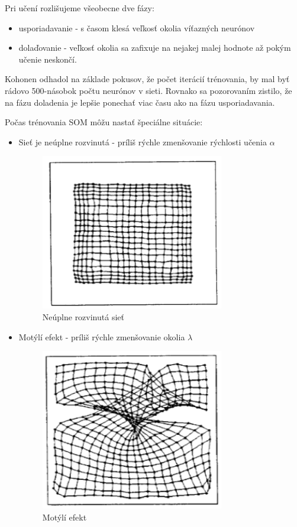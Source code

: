 Pri učení rozlišujeme všeobecne dve fázy:
\begin{itemize}
	\item usporiadavanie - s časom klesá veľkosť okolia víťazných neurónov 
	\item dolaďovanie - veľkosť okolia sa zafixuje na nejakej malej hodnote až pokým učenie neskončí.
\end{itemize}

Kohonen odhadol na základe pokusov, že počet iterácií trénovania, by mal byť rádovo 500-násobok počtu neurónov v sieti.
Rovnako sa pozorovaním zistilo, že na fázu doladenia je lepšie ponechať viac času ako na fázu usporiadavania.

Počas trénovania SOM môžu nastať špeciálne situácie:

\begin{itemize}
	\item Sieť je neúplne rozvinutá - príliš rýchle zmenšovanie rýchlosti učenia $\alpha$
	\begin{figure}[H]
		\centering
		\includegraphics[width=8cm]{assets/too_fast}
		\caption{Neúplne rozvinutá sieť}
	\end{figure}
	
	\item Motýlí efekt - príliš rýchle zmenšovanie okolia $\lambda$
	\begin{figure}[H]
		\centering
		\includegraphics[width=8cm]{assets/butterfly_effect}
		\caption{Motýlí efekt}
	\end{figure}
	

\end{itemize}
